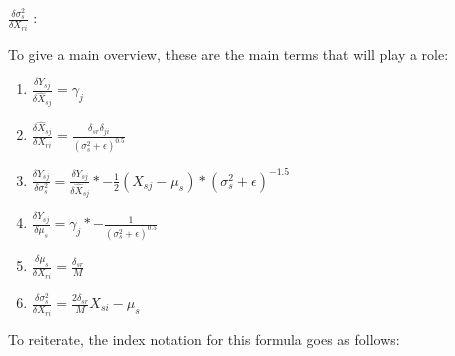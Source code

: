 {\Large $\frac{\delta \sigma_s^2}{\delta X_{ri}}$ }:
\vspace{1cm}

To give a main overview, these are the main terms that will play a role:

\begin{enumerate}
    \item $\frac{\delta Y_{sj}}{\delta \hat{X}_{sj}} = \gamma_j$
    \item $\frac{\delta \hat{X}_{sj}}{\delta X_{ri}} = \frac{\delta_{sr}\delta_{ji}}{(\sigma_s^2 + \epsilon)^{0.5}} $
    \item $\frac{\delta Y_{sj}}{\delta \sigma^2_s} = \frac{\delta Y_{sj}}{\delta \hat{X}_{sj}}
            * - \frac{1}{2} (X_{sj} - \mu_s) * (\sigma_s^2 + \epsilon)^{-1.5 }$
    \item $\frac{\delta Y_{sj}}{\delta \mu_s} = \gamma_j *  - \frac{1}{(\sigma_s^2 + \epsilon)^{0.5}}$
    \item $\frac{\delta \mu_s}{\delta X_{ri}} = \frac{\delta_{sr}}{M} $
    \item $\frac{\delta \sigma^2_s}{\delta X_{ri}} = \frac{2 \delta_{sr}}{M} X_{si} - \mu_s$
\end{enumerate}

To reiterate, the index notation for this formula goes as follows:

